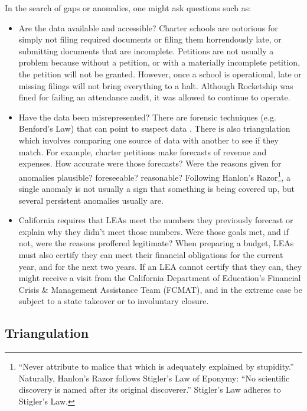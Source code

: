 In the search of gaps or anomalies, one might ask questions such as:
\begin{itemize}
\item Are the data available and accessible? Charter schools are notorious for simply not filing required documents or filing them horrendously late, or submitting documents that are incomplete. Petitions are not usually a problem because without a petition, or with a materially incomplete petition, the petition will not be granted. However, once a school is operational, late or missing filings will not bring everything to a halt. Although Rocketship was fined for failing an attendance audit, it was allowed to continue to operate.
  \item Have the data been misrepresented? There are forensic techniques (e.g. Benford's Law) that can point to suspect data \parencite{Zhu.etal2021}. There is also triangulation which involves comparing one source of data with another to see if they match. For example, charter petitions make forecasts of revenue and expenses. How accurate were those forecasts? Were the reasons given for anomalies plausible? foreseeable? reasonable? Following Hanlon's Razor\footnote{``Never attribute to malice that which is adequately explained by stupidity.'' Naturally, Hanlon's Razor follows Stigler's Law of Eponymy: ``No scientific discovery is named after its original discoverer.'' Stigler's Law adheres to Stigler's Law.}, a single anomaly is not usually a sign that something is being covered up, but several persistent anomalies usually are. 
  \item California requires that LEAs meet the numbers they previously forecast or explain why they didn't meet those numbers. Were those goals met, and if not, were the reasons proffered legitimate? When preparing a budget, LEAs must also certify they can meet their financial obligations for the current year, and for the next two years. If an LEA cannot certify that they can, they might receive a visit from the California Department of Education's Financial Crisis \& Management Assistance Team (FCMAT), and in the extreme case be subject to a state takeover or to involuntary closure. 
\end{itemize}%

\subsection{Triangulation}\label{sec:triangulation}\indent

